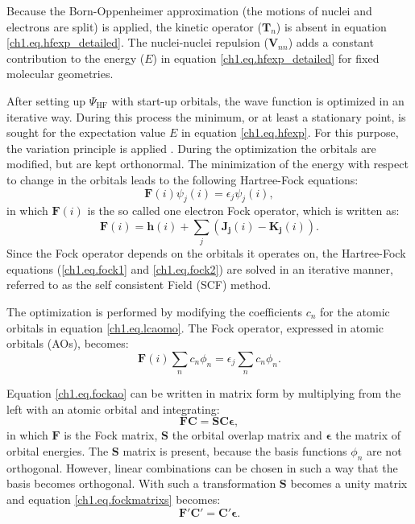 Because the Born-Oppenheimer approximation (the motions of nuclei and electrons are split) is applied, the kinetic operator ($\mathbf{T}_{n}$) is absent in equation \ref{ch1.eq.hfexp_detailed}. The nuclei-nuclei repulsion ($\mathbf{V}_{nn}$) adds a constant contribution to the energy ($E$) in equation \ref{ch1.eq.hfexp_detailed} for fixed molecular geometries.

After setting up $\Psi_\mathrm{HF}$ with start-up orbitals, the wave function is optimized in an iterative way. During this process the minimum, or at least a stationary point, is sought for the expectation value $E$ in equation \ref{ch1.eq.hfexp}. For this purpose, the variation principle is applied \cite{varia}. During the optimization the orbitals are modified, but are kept orthonormal. The minimization of the energy with respect to change in the orbitals leads to the following Hartree-Fock equations:
\begin{equation}
\mathbf{F}(i)\psi_j(i)=\epsilon_j \psi_j(i),
\label{ch1.eq.fock1}
\end{equation}
in which $\mathbf{F}(i)$ is the so called one electron Fock operator, which is written as:
\begin{equation}
\mathbf{F}(i)=\mathbf{h}(i) + \sum_j (\mathbf{J_j}(i) - \mathbf{K_j}(i)).
\label{ch1.eq.fock2}
\end{equation}
Since the Fock operator depends on the orbitals it operates on, the Hartree-Fock equations (\ref{ch1.eq.fock1} and \ref{ch1.eq.fock2}) are solved in an iterative manner, referred to as the self consistent Field (SCF) method.

The optimization is performed by modifying the coefficients $c_n$ for the atomic orbitals in equation \ref{ch1.eq.lcaomo}. The Fock operator, expressed in atomic orbitals (AOs), becomes:
\begin{equation}
\mathbf{F}(i)\sum_n c_n \phi_n = \epsilon_j \sum_n c_n \phi_n.
\label{ch1.eq.fockao}
\end{equation}

Equation \ref{ch1.eq.fockao} can be written in matrix form by multiplying from the left with an atomic orbital and integrating:
\begin{equation}
\mathbf{F}\mathbf{C} = \mathbf{S}\mathbf{C}\mathbf{\epsilon},
\label{ch1.eq.fockmatrixs}
\end{equation}
in which $\mathbf{F}$ is the Fock matrix, $\mathbf{S}$ the orbital overlap matrix and $\mathbf{\epsilon}$ the matrix of orbital energies. The $\mathbf{S}$ matrix is present, because the basis functions $\phi_n$ are not orthogonal. However, linear combinations can be chosen in such a way that the basis becomes orthogonal. With such a transformation $\mathbf{S}$ becomes a unity matrix and equation \ref{ch1.eq.fockmatrixs} becomes:
\begin{equation}
\mathbf{F'}\mathbf{C'} = \mathbf{C'}\mathbf{\epsilon}.
\end{equation}

